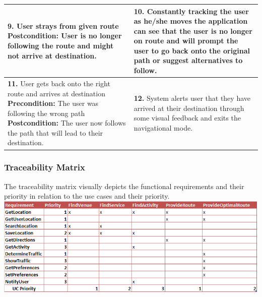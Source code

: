 \documentclass[a4paper,12pt]{article}
\begin{document}
\begin{table}[!htbp]
\begin{tabular}{|L|L|}
\hline
\textbf{9.} User strays from given route \linebreak \linebreak
\textbf{Postcondition:} User is no longer following the route and might not arrive at destination.
& \textbf{10.} Constantly tracking the user as he/she moves the application can see that the user is no longer on route and will prompt the user to go back onto the original path or suggest alternatives to follow. \linebreak \linebreak
\\
\hline
\textbf{11.} User gets back onto the right route and arrives at destination \linebreak \linebreak
\textbf{Precondition:} The user was following the wrong path \linebreak 
\textbf{Postcondition:} The user now follows the path that will lead to their destination.
& \textbf{12.} System alerts user that they have arrived at their destination through some visual feedback and exits the navigational mode. \linebreak
\\
\hline	
\end{tabular}
\egroup	
\end{table}

\subsubsection{Traceability Matrix}
The traceability matrix visually depicts the functional requirements and their priority in relation to the use cases and their priority. \\
\includegraphics[width=\textwidth]{images/trmatrix.png}
\end{document}
